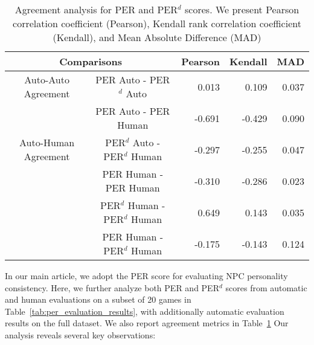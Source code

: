 \begin{table}[!ht]
    \centering
    \begin{tabular}{cc|rrr}
    \toprule
    \multicolumn{2}{c|}{Comparisons} & Pearson & Kendall & MAD \\
    \midrule
    \multirow{1}{*}{Auto-Auto Agreement} & PER Auto - PER$^d$ Auto & 0.013 & 0.109 & 0.037 \\
    \midrule
    \multirow{3}{*}{Auto-Human Agreement} & PER Auto - PER Human     & -0.691 & -0.429 & 0.090\\
    & PER$^d$ Auto - PER$^d$ Human &-0.297 & -0.255 & 0.047\\
    \midrule
    \multirow{3}{*}{Human-Human Agreement} &PER Human - PER Human & -0.310 & -0.286 & 0.023\\
    &PER$^d$ Human - PER$^d$ Human & 0.649 & 0.143 & 0.035\\
    &PER Human - PER$^d$ Human &-0.175&-0.143 & 0.124\\
    \bottomrule
    \end{tabular}
    \caption{Agreement analysis for PER and PER$^d$ scores. We present Pearson correlation coefficient (Pearson), Kendall rank correlation coefficient (Kendall), and Mean Absolute Difference (MAD)}
    \label{tab:per_agreement}
\end{table}

In our main article, we adopt the PER score for evaluating NPC personality consistency. Here, we further analyze both PER and PER$^d$ scores from automatic and human evaluations on a subset of 20 games in Table~\ref{tab:per_evaluation_results}, with additionally automatic evaluation results on the full dataset. We also report agreement metrics in Table~\ref{tab:per_agreement} Our analysis reveals several key observations:

